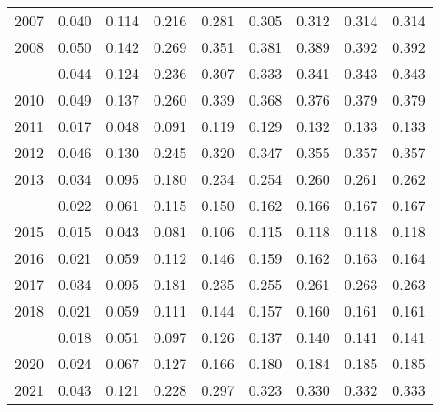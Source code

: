 \documentclass[
]{article}
\begin{document}
\begin{longtable}[t]{lrrrrrrrr}
2007 & 0.040 & 0.114 & 0.216 & 0.281 & 0.305 & 0.312 & 0.314 & 0.314\\
2008 & 0.050 & 0.142 & 0.269 & 0.351 & 0.381 & 0.389 & 0.392 & 0.392\\
\addlinespace
2009 & 0.044 & 0.124 & 0.236 & 0.307 & 0.333 & 0.341 & 0.343 & 0.343\\
2010 & 0.049 & 0.137 & 0.260 & 0.339 & 0.368 & 0.376 & 0.379 & 0.379\\
2011 & 0.017 & 0.048 & 0.091 & 0.119 & 0.129 & 0.132 & 0.133 & 0.133\\
2012 & 0.046 & 0.130 & 0.245 & 0.320 & 0.347 & 0.355 & 0.357 & 0.357\\
2013 & 0.034 & 0.095 & 0.180 & 0.234 & 0.254 & 0.260 & 0.261 & 0.262\\
\addlinespace
2014 & 0.022 & 0.061 & 0.115 & 0.150 & 0.162 & 0.166 & 0.167 & 0.167\\
2015 & 0.015 & 0.043 & 0.081 & 0.106 & 0.115 & 0.118 & 0.118 & 0.118\\
2016 & 0.021 & 0.059 & 0.112 & 0.146 & 0.159 & 0.162 & 0.163 & 0.164\\
2017 & 0.034 & 0.095 & 0.181 & 0.235 & 0.255 & 0.261 & 0.263 & 0.263\\
2018 & 0.021 & 0.059 & 0.111 & 0.144 & 0.157 & 0.160 & 0.161 & 0.161\\
\addlinespace
2019 & 0.018 & 0.051 & 0.097 & 0.126 & 0.137 & 0.140 & 0.141 & 0.141\\
2020 & 0.024 & 0.067 & 0.127 & 0.166 & 0.180 & 0.184 & 0.185 & 0.185\\
2021 & 0.043 & 0.121 & 0.228 & 0.297 & 0.323 & 0.330 & 0.332 & 0.333\\*
\end{longtable}
\end{document}
